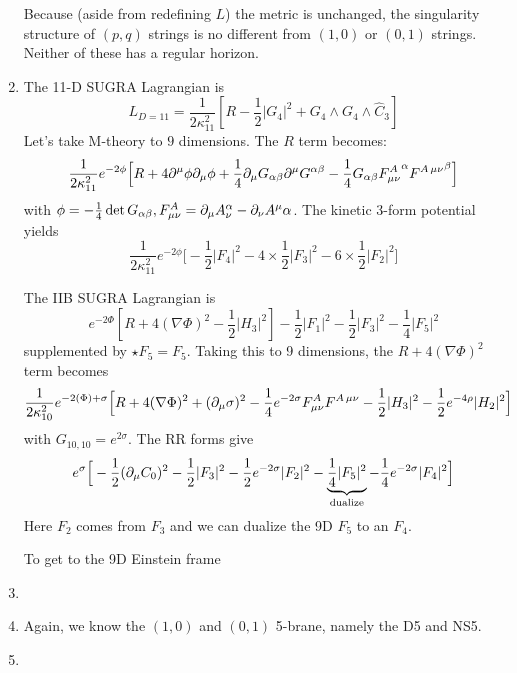 \documentclass[11pt, class=article, crop=false]{standalone}
\begin{document}
\begin{enumerate}
	Because (aside from redefining $L$) the metric is unchanged, the singularity structure of $(p,q)$ strings is no different from $(1,0)$ or $(0,1)$ strings. Neither of these has a regular horizon.
	
	
	\item
	
	The 11-D SUGRA Lagrangian is
	\[
		L_{D=11} = \frac{1}{2\kappa_{11}^2}\left[R - \frac12 |G_4|^2 + G_4 \wedge G_4 \wedge \hat C_3 \right]
	\]
	Let's take M-theory to $9$ dimensions. The $R$ term becomes:
	\[
		\frac{1}{2 \kappa_{11}^2} e^{-2 \phi} \Big[R + 4 \partial^\mu \phi \partial_\mu \phi + \frac14 \partial_\mu G_{\alpha \beta} \partial^\mu G^{\alpha \beta} - \frac14 G_{\alpha \beta} {F_{\mu \nu}^A}^\alpha {F^{A\, \mu \nu}}^\beta \Big]
	\]
	with $\phi = -\frac14 \det G_{\alpha \beta}, F_{\mu \nu}^A = \partial_\mu A_\nu^\alpha - \partial_\nu A^\mu \alpha$. The kinetic 3-form potential yields
	\[
		\frac{1}{2 \kappa_{11}^2} e^{-2 \phi} \Big[-\frac12 |F_4|^2 - 4 \times \frac12 |F_3|^2 - 6 \times \frac12 |F_2|^2 \Big]
	\]
	
	The IIB SUGRA Lagrangian is
	\[
		e^{-2\Phi} \left[R + 4 (\nabla \Phi)^2 - \frac12 |H_3|^2 \right] - \frac12 |F_1|^2 - \frac12 |F_3|^2 - \frac14 |F_5|^2
	\]
	supplemented by $\star F_5 = F_5$. Taking this to 9 dimensions, the $R + 4 (\nabla \Phi)^2$ term becomes
	\[
		\frac{1}{2 \kappa_{10}^2} e^{-2 (\Phi) + \sigma} \Big[R + 4 (\nabla \Phi)^2 + (\partial_\mu \sigma)^2 - \frac14 e^{-2 \sigma} {F_{\mu \nu}^A} {F^{A\, \mu \nu}}  - \frac{1}{2} |H_3|^2 - \frac12 e^{-4 \rho} |H_{2}|^2 \Big]
	\]
	with $G_{10,10} = e^{2 \sigma}$. The RR forms give
	\[
		e^{\sigma} \Big[ -\frac12 (\partial_\mu C_0)^2 - \frac12 |F_3|^2 - \frac12 e^{-2 \sigma} |F_2|^2 - \underbrace{\frac14 |F_5|^2}_{\text{dualize} } - \frac14 e^{-2\sigma} |F_4|^2 \Big]
	\]
	Here $F_2$ comes from $F_3$ and we can dualize the 9D $F_5$ to an $F_4$.
	
	To get to the 9D Einstein frame 
	\item 
	
	\item Again, we know the $(1,0)$ and $(0,1)$ 5-brane, namely the D5 and NS5. 
	
	\item 
	
	
\end{enumerate}

\end{document}
